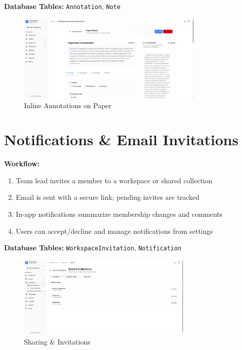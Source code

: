     \textbf{Database Tables:} \texttt{Annotation}, \texttt{Note}

\begin{figure}[H]
\centering
\includegraphics[width=0.8\textwidth]{images/screenshots/paper_details_1.png}
\caption{Inline Annotations on Paper}
\label{fig:annotations}
\end{figure}

\section{Notifications \& Email Invitations}

    \textbf{Workflow:}
\begin{enumerate}[leftmargin=*,topsep=3pt,itemsep=2pt]
    \item Team lead invites a member to a workspace or shared collection
    \item Email is sent with a secure link; pending invites are tracked
    \item In-app notifications summarize membership changes and comments
    \item Users can accept/decline and manage notifications from settings
\end{enumerate}

	\textbf{Database Tables:} \texttt{WorkspaceInvitation}, \texttt{Notification}

\begin{figure}[H]
\centering
\includegraphics[width=0.75\textwidth]{images/screenshots/shared_collection.png}
\caption{Sharing \& Invitations}
\label{fig:notifications}
\end{figure}

